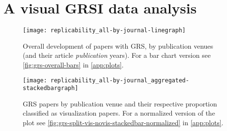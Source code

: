 \documentclass[conference,svgnames]{vgtc}                     %
\begin{document}
\section{A visual GRSI data analysis}
\label{sec:visual_analysis}

\begin{figure}
	\centering
	\texttt{[image: replicability\_all-by-journal-linegraph]}
	\caption{Overall development of papers with GRS, by publication venues (and their article \emph{publication} years). For a bar chart version see \autoref{fig:grs-overall-bars} in \autoref{app:plots}.}
	\label{fig:grs-overall}
\end{figure}

\begin{figure}
	\centering
	\texttt{[image: replicability\_all-by-journal\_aggregated-stackedbargraph]}
	\caption{GRS papers by publication venue and their respective proportion classified as visualization papers. For a normalized version of the plot see \autoref{fig:grs-split-vis-novis-stackedbar-normalized} in \autoref{app:plots}.}
	\label{fig:grs-split-vis-novis-stackedbar}
\end{figure}
\end{document}
